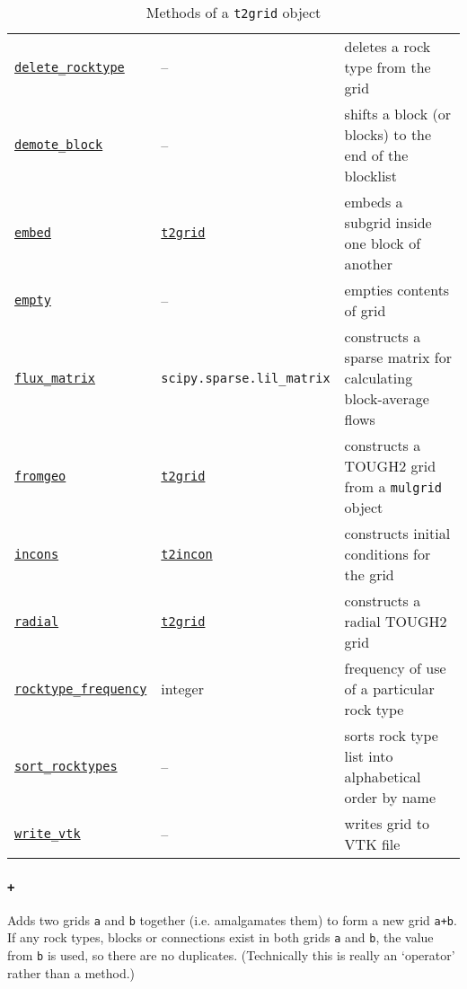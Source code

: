 \begin{table}
\begin{center}
\begin{tabular}{|l|l|p{65mm}|}
      \hyperref[sec:t2grid:delete_rocktype]{\texttt{delete\_rocktype}} & -- & deletes a rock type from the grid\\
      \hyperref[sec:t2grid:demote_block]{\texttt{demote\_block}} & -- & shifts a block (or blocks) to the end of the blocklist\\
      \hyperref[sec:t2grid:embed]{\texttt{embed}} & \hyperref[t2grids]{\texttt{t2grid}} & embeds a subgrid inside one block of another \\
      \hyperref[sec:t2grid:empty]{\texttt{empty}} & -- & empties contents of grid\\
      \hyperref[sec:t2grid:flux_matrix]{\texttt{flux\_matrix}} & \texttt{scipy.sparse.lil\_matrix} & constructs a sparse matrix for calculating block-average flows \\
      \hyperref[sec:t2grid:fromgeo]{\texttt{fromgeo}} & \hyperref[t2grids]{\texttt{t2grid}} & constructs a TOUGH2 grid from a \texttt{mulgrid} object\\
      \hyperref[sec:t2grid:incons]{\texttt{incons}} & \hyperref[incons]{\texttt{t2incon}} & constructs initial conditions for the grid\\
      \hyperref[sec:t2grid:radial]{\texttt{radial}} & \hyperref[t2grids]{\texttt{t2grid}} & constructs a radial TOUGH2 grid\\
      \hyperref[sec:t2grid:rocktype_frequency]{\texttt{rocktype\_frequency}} & integer & frequency of use of a particular rock type\\
      \hyperref[sec:t2grid:sort_rocktypes]{\texttt{sort\_rocktypes}} & -- & sorts rock type list into alphabetical order by name\\
      \hyperref[sec:t2grid:write_vtk]{\texttt{write\_vtk}} & -- & writes grid to VTK file\\
      \hline
    \end{tabular}
    \caption{Methods of a \texttt{t2grid} object}
    \label{tb:t2grid_methods}
  \end{center}
\end{table}

\begin{snugshade}
\subsubsection{\texttt{+}}
\end{snugshade}
\label{sec:t2grid:plus}

Adds two grids \texttt{a} and \texttt{b} together (i.e. amalgamates them) to form a new grid \texttt{a+b}.  If any rock types, blocks or connections exist in both grids \texttt{a} and \texttt{b}, the value from \texttt{b} is used, so there are no duplicates.  (Technically this is really an `operator' rather than a method.)

